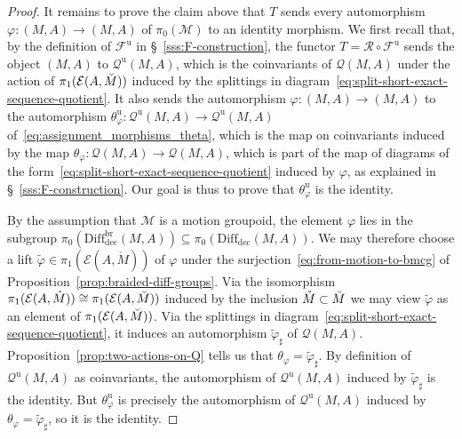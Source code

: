 \documentclass[AHL,Unicode,published]{cedram}
\newcommand{\Int}{\mathring}
\newcommand{\unt}{\mathrm{u}}
\newcommand{\rdec}{\mathrm{dec}}
\newcommand{\sR}{\mathscr{R}}
\newcommand{\cE}{\mathcal{E}}
\newcommand{\cF}{\mathcal{F}}
\newcommand{\cM}{\mathcal{M}}
\newcommand{\cQ}{\mathcal{Q}}
\newcommand{\diffdec}{\ensuremath{\mathrm{Diff}_{\rdec}}}
\newcommand{\diffdecbr}{\ensuremath{\mathrm{Diff}_{\rdec}^{\mathrm{br}}}}
\begin{document}
\begin{proof}
It remains to prove the claim above that $T$ sends every automorphism $\varphi \colon (M,A) \to (M,A)$ of $\pi_{0}(\cM)$ to an identity morphism. We first recall that, by the definition of $\cF^{\unt}$ in \S~\ref{sss:F-construction}, the functor $T = \sR \circ \cF^{\unt}$ sends the object $(M,A)$ to $\cQ^{\unt}(M,A)$, which is the coinvariants of $\cQ(M,A)$ under the action of $\pi_{1}(\cE(A,\Breve{M}))$ induced by the splittings in diagram~\eqref{eq:split-short-exact-sequence-quotient}. It also sends the automorphism $\varphi \colon (M,A) \to (M,A)$ to the automorphism $\theta^{\unt}_\varphi \colon \cQ^{\unt}(M,A) \to \cQ^{\unt}(M,A)$ of~\eqref{eq:assignment_morphisms_theta}, which is the map on coinvariants induced by the map $\theta_\varphi \colon \cQ(M,A) \to \cQ(M,A)$, which is part of the map of diagrams of the form~\eqref{eq:split-short-exact-sequence-quotient} induced by $\varphi$, as explained in \S~\ref{sss:F-construction}. Our goal is thus to prove that $\theta^{\unt}_\varphi$ is the identity.

By the assumption that $\cM$ is a motion groupoid, the element $\varphi$ lies in the subgroup $\pi_{0}(\diffdecbr(M,A)) \subseteq \pi_{0}(\diffdec(M,A))$. We may therefore choose a lift $\widetilde{\varphi} \in \pi_{1}(\cE(A,\Int{M}))$ of $\varphi$ under the surjection~\eqref{eq:from-motion-to-bmcg} of Proposition~\ref{prop:braided-diff-groups}. Via the isomorphism $\pi_{1}(\cE(A,\Int{M})) \cong \pi_{1}(\cE(A,\Breve{M}))$ induced by the inclusion $\Int{M} \subset \Breve{M}$ we may view $\widetilde{\varphi}$ as an element of $\pi_{1}(\cE(A,\Breve{M}))$. Via the splittings in diagram~\eqref{eq:split-short-exact-sequence-quotient}, it induces an automorphism $\widetilde{\varphi}_\sharp$ of $\cQ(M,A)$. Proposition~\ref{prop:two-actions-on-Q} tells us that $\theta_\varphi = \widetilde{\varphi}_\sharp$. By definition of $\cQ^{\unt}(M,A)$ as coinvariants, the automorphism of $\cQ^{\unt}(M,A)$ induced by $\widetilde{\varphi}_\sharp$ is the identity. But $\theta^{\unt}_\varphi$ is precisely the automorphism of $\cQ^{\unt}(M,A)$ induced by $\theta_\varphi = \widetilde{\varphi}_\sharp$, so it is the identity.
\end{proof}
\end{document}

